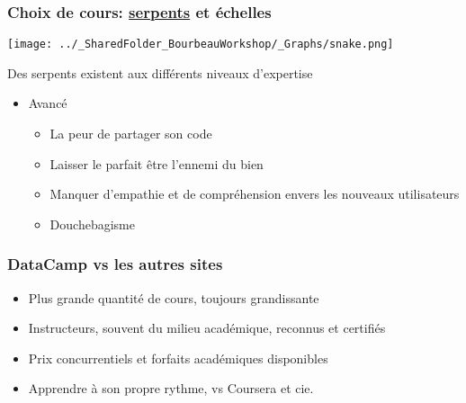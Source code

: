 \documentclass{beamer}
\begin{document}
    \begin{frame}
    
      \frametitle{Choix de cours: \uline{serpents} et échelles} \vspace{1cm}
      
        \begin{center}
        
          \texttt{[image: ../\_SharedFolder\_BourbeauWorkshop/\_Graphs/snake.png]}
         
        \end{center} 
        
  Des serpents existent aux différents niveaux d'expertise
      
    \begin{itemize}
        
      \item{Avancé}
        
          \begin{itemize}
            \item La peur de partager son code 
            \item Laisser le parfait être l’ennemi du bien
            \item Manquer d'empathie et de compréhension envers les nouveaux utilisateurs
            \item Douchebagisme

          \end{itemize}
        
        \end{itemize}
        
     \end{frame}
     
  

    \begin{frame}
    
      \frametitle{DataCamp vs les autres sites} \vspace{1cm}
      
        
        \begin{itemize}
          \item Plus grande quantité de cours, toujours grandissante 
          \item Instructeurs, souvent du milieu académique, reconnus et certifiés
          \item Prix concurrentiels et forfaits académiques disponibles
          \item Apprendre à son propre rythme, vs Coursera et cie. 

        \end{itemize}
      
     \end{frame}
     
\end{document}
